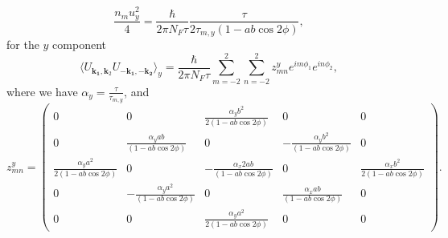 \documentclass[aps,prb,amsmath,amssymb,footinbib,showpacs,twocolumn]{revtex4-2}
\begin{document}
\begin{widetext}
\begin{equation}
  \frac{n_{m}u^{2}_{y}}{4}=\frac{\hbar}{2\pi N_{F}\tau}\frac{\tau}{2\tau_{m,y}(1-ab\cos2\phi)},  
\end{equation}
for the $y$ component
\begin{equation}
    \langle U_{\mathbf{k_1},\mathbf{k}_{2}}U_{\mathbf{-k_1},\mathbf{-k_2}}\bigl \rangle_{y}=\frac{\hbar}{2\pi N_{F}\tau}\sum_{m=-2}^{2}\sum_{n=-2}^{2}z^{y}_{mn}e^{im\phi_{1}}e^{in\phi_{2}},
\end{equation}
where we have $\alpha_{y}=\frac{\tau}{\tau_{m,y}}$, and 
\begin{equation}
z^{y}_{mn}= \begin{pmatrix}
 0 & 0 & \frac{\alpha_{y}b^{2}}{2(1-ab\cos2\phi)} & 0 & 0\\
        0 & \frac{\alpha_{y}ab}{(1-ab\cos2\phi)} & 0 & -\frac{\alpha_{y}b^{2}}{(1-ab\cos2\phi)} & 0 \\
        \frac{\alpha_{y}a^{2}}{2(1-ab\cos2\phi)} & 0 & -\frac{\alpha_{x}2ab}{(1-ab\cos2\phi)} & 0 & \frac{\alpha_{x}b^{2}}{2(1-ab\cos2\phi)} \\
        0 & -\frac{\alpha_{y}a^{2}}{(1-ab\cos2\phi)} & 0 & \frac{\alpha_{x}ab}{(1-ab\cos2\phi)} & 0\\
       0 & 0 & \frac{\alpha_{y}a^{2}}{2(1-ab\cos2\phi)} & 0 & 0
\end{pmatrix}. 
\end{equation}


\end{widetext}
\end{document}
